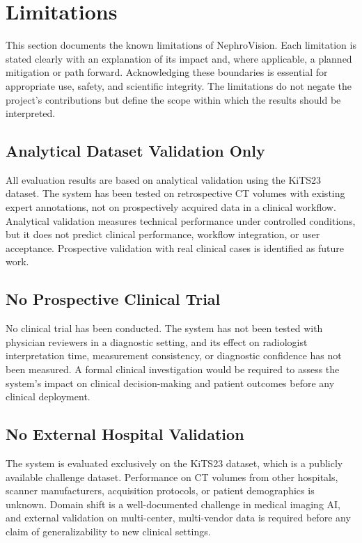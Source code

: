 \section{Limitations}

This section documents the known limitations of NephroVision. Each limitation is stated clearly with an explanation of its impact and, where applicable, a planned mitigation or path forward. Acknowledging these boundaries is essential for appropriate use, safety, and scientific integrity. The limitations do not negate the project's contributions but define the scope within which the results should be interpreted.

\subsection{Analytical Dataset Validation Only}

All evaluation results are based on analytical validation using the KiTS23 dataset. The system has been tested on retrospective CT volumes with existing expert annotations, not on prospectively acquired data in a clinical workflow. Analytical validation measures technical performance under controlled conditions, but it does not predict clinical performance, workflow integration, or user acceptance. Prospective validation with real clinical cases is identified as future work.

\subsection{No Prospective Clinical Trial}

No clinical trial has been conducted. The system has not been tested with physician reviewers in a diagnostic setting, and its effect on radiologist interpretation time, measurement consistency, or diagnostic confidence has not been measured. A formal clinical investigation would be required to assess the system's impact on clinical decision-making and patient outcomes before any clinical deployment.

\subsection{No External Hospital Validation}

The system is evaluated exclusively on the KiTS23 dataset, which is a publicly available challenge dataset. Performance on CT volumes from other hospitals, scanner manufacturers, acquisition protocols, or patient demographics is unknown. Domain shift is a well-documented challenge in medical imaging AI, and external validation on multi-center, multi-vendor data is required before any claim of generalizability to new clinical settings.

